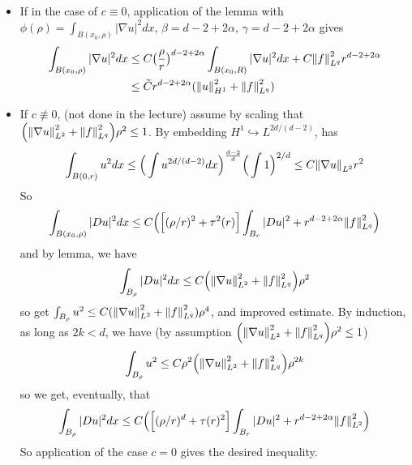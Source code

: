 \documentclass[12pt,a4paper]{article}
\newenvironment{proof}
{\begin{changemargin}{0.5cm}{0.5cm} 
	}%
	{\end{changemargin}
}
\newenvironment{subproof}
{\begin{changemargin}{0.5cm}{0.5cm} 
	}%
	{\end{changemargin}
}
\newenvironment{p}
{\begin{proof} 
	}%
	{\end{proof}
}
\begin{document}
\begin{p}
\begin{subproof}
\eos
\end{subproof}
\begin{itemize}
\item If in the case of $c\equiv 0$, application of the lemma with $\phi(\rho) = \int_{B(x_0, \rho)} |\nabla u|^2 dx$, $\beta =d-2+2\alpha$, $\gamma =d-2+2\alpha$ gives
\begin{align*}
\int_{B(x_0, \rho)} |\nabla u|^2 dx & \leq C \big( \frac{\rho}{r} \big)^{d-2+2\alpha} \int_{B(x_0, R)} |\nabla u|^2 dx + C \snorms{f}{L^q}^2 r^{d-2+2\alpha} \\
& \leq \tilde{C} r^{d-2+2\alpha} (\snorms{u}{H^1}^2 + \snorms{f}{L^q}^2)
\end{align*}
\item If $c\not\equiv 0$, (not done in the lecture) assume by scaling that $\Big( \snorms{\nabla u}{L^2}^2 + \snorms{f}{L^q}^2 \Big)\rho^2\leq 1$. By embedding $H^1 \hookrightarrow L^{2d/(d-2)}$, has
\begin{align*}
\int_{B(0,r)} u^2 dx \leq \Big( \int u^{2d/(d-2)} dx\Big)^{\frac{d-2}{d}} \Big( \int 1 \Big)^{2/d} \leq C \snorms{\nabla u}{L^2}r^2
\end{align*}
So
\begin{align*}
\int_{B(x_0, \rho)} |Du|^2 dx \leq C\Big( \Big[ (\rho/r)^2 + \tau^2(r) \Big] \int_{B_r} |Du|^2 + r^{d-2+2\alpha} \snorms{f}{L^q}^2 \Big)
\end{align*}
and by lemma, we have
\begin{align*}
\int_{B_{\rho}}|Du|^2 dx \leq C \Big( \snorms{\nabla u}{L^2}^2 + \snorms{f}{L^q}^2 \Big)\rho^2
\end{align*}
so get $\int_{B_{\rho}} u^2 \leq C(\snorms{\nabla u}{L^2}^2 + \snorms{f}{L^q}^2)\rho^4$, and improved estimate. By induction, as long as $2k<d$, we have (by assumption $\Big( \snorms{\nabla u}{L^2}^2 + \snorms{f}{L^q}^2 \Big)\rho^2 \leq 1$)
\begin{align*}
\int_{B_{\rho}} u^2 \leq C \rho^2 \Big( \snorms{\nabla u}{L^2}^2 + \snorms{f}{L^q}^2 \Big)\rho^{2k}
\end{align*}
so we get, eventually, that
\begin{align*}
\int_{B_{\rho}} |Du|^2 dx \leq C\Big( \Big[ (\rho/r)^d + \tau(r)^2 \Big]\int_{B_r}|Du|^2 + r^{d-2+2\alpha}\snorms{f}{L^2}^2 \Big)
\end{align*}
So application of the case $c=0$ gives the desired inequality.
\end{itemize}
\eop
\end{p}
\s

\newday
\end{document}
